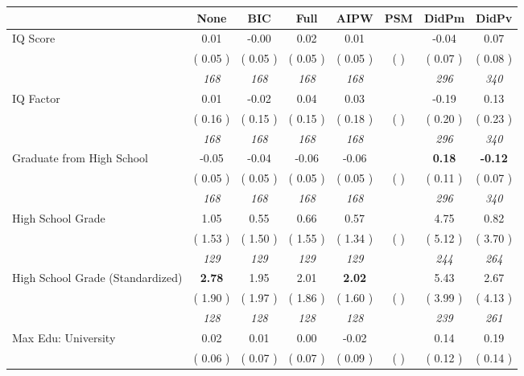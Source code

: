 \begin{tabular}{l c c c c c c c}
\toprule
 & None & BIC & Full & AIPW & PSM & DidPm & DidPv \\
\midrule
IQ Score &      0.01 &     -0.00 &      0.02 &      0.01 & &     -0.04 &      0.07 \\
& (     0.05 ) & (     0.05 ) & (     0.05 ) & (     0.05 ) & ( ) & (     0.07 ) & (     0.08 ) \\
& \textit{ 168 } & \textit{ 168 } & \textit{ 168 } & \textit{ 168 } & & \textit{ 296 } & \textit{ 340 } \\
IQ Factor &      0.01 &     -0.02 &      0.04 &      0.03 & &     -0.19 &      0.13 \\
& (     0.16 ) & (     0.15 ) & (     0.15 ) & (     0.18 ) & ( ) & (     0.20 ) & (     0.23 ) \\
& \textit{ 168 } & \textit{ 168 } & \textit{ 168 } & \textit{ 168 } & & \textit{ 296 } & \textit{ 340 } \\
Graduate from High School &     -0.05 &     -0.04 &     -0.06 &     -0.06 & & \textbf{      0.18 } & \textbf{     -0.12 } \\
& (     0.05 ) & (     0.05 ) & (     0.05 ) & (     0.05 ) & ( ) & (     0.11 ) & (     0.07 ) \\
& \textit{ 168 } & \textit{ 168 } & \textit{ 168 } & \textit{ 168 } & & \textit{ 296 } & \textit{ 340 } \\
High School Grade &      1.05 &      0.55 &      0.66 &      0.57 & &      4.75 &      0.82 \\
& (     1.53 ) & (     1.50 ) & (     1.55 ) & (     1.34 ) & ( ) & (     5.12 ) & (     3.70 ) \\
& \textit{ 129 } & \textit{ 129 } & \textit{ 129 } & \textit{ 129 } & & \textit{ 244 } & \textit{ 264 } \\
High School Grade (Standardized) & \textbf{      2.78 } &      1.95 &      2.01 & \textbf{     2.02} & &      5.43 &      2.67 \\
& (     1.90 ) & (     1.97 ) & (     1.86 ) & (     1.60 ) & ( ) & (     3.99 ) & (     4.13 ) \\
& \textit{ 128 } & \textit{ 128 } & \textit{ 128 } & \textit{ 128 } & & \textit{ 239 } & \textit{ 261 } \\
Max Edu: University &      0.02 &      0.01 &      0.00 &     -0.02 & &      0.14 &      0.19 \\
& (     0.06 ) & (     0.07 ) & (     0.07 ) & (     0.09 ) & ( ) & (     0.12 ) & (     0.14 ) \\

\end{tabular}
